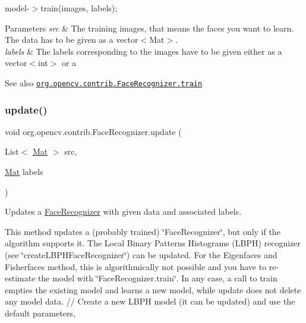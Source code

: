 {\ttfamily }

{\ttfamily }

{\ttfamily model-\/$>$train(images, labels);}

{\ttfamily }

{\ttfamily 
\begin{DoxyParams}{Parameters}
{\em src} & The training images, that means the faces you want to learn. The data has to be given as a {\ttfamily vector$<$\+Mat$>$}. \\
\hline
{\em labels} & The labels corresponding to the images have to be given either as a {\ttfamily vector$<$int$>$} or a\\
\hline
\end{DoxyParams}
\begin{DoxySeeAlso}{See also}
\href{http://docs.opencv.org/modules/contrib/doc/facerec_api.html#facerecognizer-train}{\tt org.\+opencv.\+contrib.\+Face\+Recognizer.\+train} 
\end{DoxySeeAlso}
}\mbox{\label{classorg_1_1opencv_1_1contrib_1_1_face_recognizer_aeda4a33d567af3958ff63c79355aaa72}} 
\subsubsection{\texorpdfstring{update()}{update()}}
{\footnotesize\ttfamily void org.\+opencv.\+contrib.\+Face\+Recognizer.\+update (\begin{DoxyParamCaption}\item[{List$<$ \mbox{\hyperlink{classorg_1_1opencv_1_1core_1_1_mat}{Mat}} $>$}]{src,  }\item[{\mbox{\hyperlink{classorg_1_1opencv_1_1core_1_1_mat}{Mat}}}]{labels }\end{DoxyParamCaption})}

Updates a \mbox{\hyperlink{classorg_1_1opencv_1_1contrib_1_1_face_recognizer}{Face\+Recognizer}} with given data and associated labels.

This method updates a (probably trained) \char`\"{}\+Face\+Recognizer\char`\"{}, but only if the algorithm supports it. The Local Binary Patterns Histograms (L\+B\+PH) recognizer (see \char`\"{}create\+L\+B\+P\+H\+Face\+Recognizer\char`\"{}) can be updated. For the Eigenfaces and Fisherfaces method, this is algorithmically not possible and you have to re-\/estimate the model with \char`\"{}\+Face\+Recognizer.\+train\char`\"{}. In any case, a call to train empties the existing model and learns a new model, while update does not delete any model data. // Create a new L\+B\+PH model (it can be updated) and use the default parameters, {\ttfamily }

